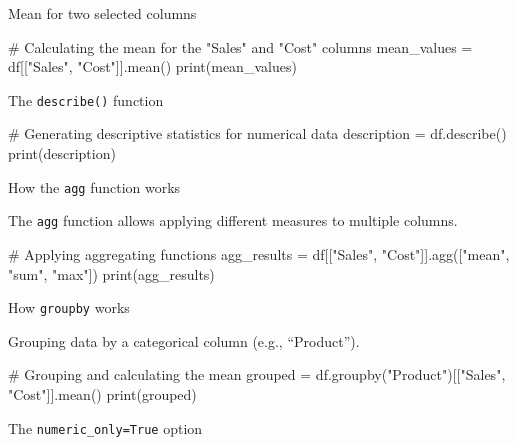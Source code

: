 \documentclass[
  english,
  letterpaper,
  DIV=11,
  numbers=noendperiod]{scrreprt}
\newenvironment{Shaded}{\begin{snugshade}}{\end{snugshade}}
\newcommand{\BuiltInTok}[1]{\textcolor[rgb]{0.00,0.23,0.31}{#1}}
\newcommand{\CommentTok}[1]{\textcolor[rgb]{0.37,0.37,0.37}{#1}}
\newcommand{\NormalTok}[1]{\textcolor[rgb]{0.00,0.23,0.31}{#1}}
\newcommand{\OperatorTok}[1]{\textcolor[rgb]{0.37,0.37,0.37}{#1}}
\newcommand{\StringTok}[1]{\textcolor[rgb]{0.13,0.47,0.30}{#1}}
\begin{document}
Mean for two selected columns

\begin{Shaded}
\begin{Highlighting}[]
\CommentTok{\# Calculating the mean for the "Sales" and "Cost" columns}
\NormalTok{mean\_values }\OperatorTok{=}\NormalTok{ df[[}\StringTok{"Sales"}\NormalTok{, }\StringTok{"Cost"}\NormalTok{]].mean()}
\BuiltInTok{print}\NormalTok{(mean\_values)}
\end{Highlighting}
\end{Shaded}

The \texttt{describe()} function

\begin{Shaded}
\begin{Highlighting}[]
\CommentTok{\# Generating descriptive statistics for numerical data}
\NormalTok{description }\OperatorTok{=}\NormalTok{ df.describe()}
\BuiltInTok{print}\NormalTok{(description)}
\end{Highlighting}
\end{Shaded}

How the \texttt{agg} function works

The \texttt{agg} function allows applying different measures to multiple
columns.

\begin{Shaded}
\begin{Highlighting}[]
\CommentTok{\# Applying aggregating functions}
\NormalTok{agg\_results }\OperatorTok{=}\NormalTok{ df[[}\StringTok{"Sales"}\NormalTok{, }\StringTok{"Cost"}\NormalTok{]].agg([}\StringTok{"mean"}\NormalTok{, }\StringTok{"sum"}\NormalTok{, }\StringTok{"max"}\NormalTok{])}
\BuiltInTok{print}\NormalTok{(agg\_results)}
\end{Highlighting}
\end{Shaded}

How \texttt{groupby} works

Grouping data by a categorical column (e.g., ``Product'').

\begin{Shaded}
\begin{Highlighting}[]
\CommentTok{\# Grouping and calculating the mean}
\NormalTok{grouped }\OperatorTok{=}\NormalTok{ df.groupby(}\StringTok{"Product"}\NormalTok{)[[}\StringTok{"Sales"}\NormalTok{, }\StringTok{"Cost"}\NormalTok{]].mean()}
\BuiltInTok{print}\NormalTok{(grouped)}
\end{Highlighting}
\end{Shaded}

The \texttt{numeric\_only=True} option
\end{document}
